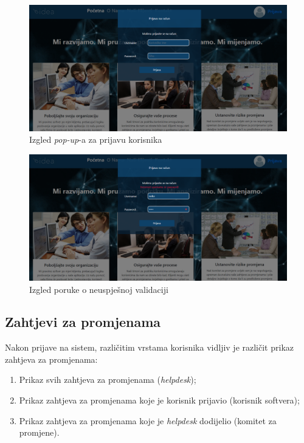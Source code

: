 \documentclass[12pt,a4paper]{article}
\begin{document}
\begin{figure}[H]
\center
\includegraphics[scale=0.35]{../res/UI/login.PNG}
\caption{Izgled \textit{pop-up}-a za prijavu korisnika}
\label{s5}
\end{figure}

\begin{figure}[H]
\center
\includegraphics[scale=0.35]{../res/UI/loginFailed.PNG}
\caption{Izgled poruke o neuspješnoj validaciji}
\label{s6}
\end{figure}

\newpage

\subsection{Zahtjevi za promjenama}

Nakon prijave na sistem, različitim vrstama korisnika vidljiv je različit prikaz zahtjeva za promjenama:

\begin{enumerate}
\item Prikaz svih zahtjeva za promjenama (\textit{helpdesk});
\item Prikaz zahtjeva za promjenama koje je korisnik prijavio (korisnik softvera);
\item Prikaz zahtjeva za promjenama koje je \textit{helpdesk} dodijelio (komitet za promjene).
\end{enumerate}
\end{document}
